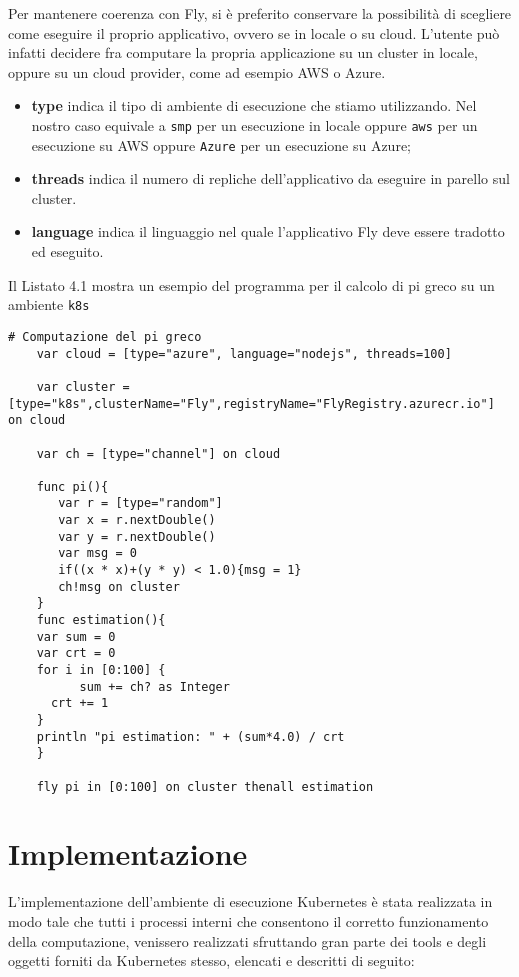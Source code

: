 Per mantenere coerenza con Fly, 
si è preferito conservare la possibilità di scegliere come eseguire il proprio applicativo, 
ovvero se in locale o su cloud. L'utente può infatti decidere fra computare la propria applicazione su un cluster in locale, 
oppure su un cloud provider, come ad esempio AWS o Azure.
\begin{itemize}
    \item\textbf{type} indica il tipo di ambiente di esecuzione che stiamo utilizzando. Nel nostro caso equivale a \verb|smp| per un esecuzione in locale oppure \verb|aws| per un esecuzione su AWS oppure \verb|Azure| per un esecuzione su Azure;
    \item\textbf{threads} indica il numero di repliche dell'applicativo da eseguire in parello sul cluster.
    \item\textbf{language} indica il linguaggio nel quale l'applicativo Fly deve essere tradotto ed eseguito.
\end{itemize}

Il Listato 4.1 mostra un esempio del programma per il calcolo di pi greco su un ambiente \verb|k8s|
\begin{lstlisting}[language=FLY,caption={Stima di PI Greco usando il metodo Monte Carlo su ambiente k8s su Azure}, label={lst:k8s}]
    # Computazione del pi greco
    var cloud = [type="azure", language="nodejs", threads=100]
    
    var cluster = [type="k8s",clusterName="Fly",registryName="FlyRegistry.azurecr.io"] on cloud 
                          
    var ch = [type="channel"] on cloud
    
    func pi(){       
       var r = [type="random"]   
       var x = r.nextDouble()          
       var y = r.nextDouble()                  
       var msg = 0  
       if((x * x)+(y * y) < 1.0){msg = 1}             
       ch!msg on cluster
    }  
    func estimation(){
    var sum = 0
    var crt = 0
    for i in [0:100] {
          sum += ch? as Integer
      crt += 1
    }
    println "pi estimation: " + (sum*4.0) / crt
    }
    
    fly pi in [0:100] on cluster thenall estimation    
\end{lstlisting}


\section{Implementazione}
L'implementazione dell'ambiente di esecuzione Kubernetes è stata realizzata in modo tale che tutti i processi interni che consentono il corretto funzionamento della computazione, 
venissero realizzati sfruttando gran parte dei tools e degli oggetti forniti da Kubernetes stesso, elencati e descritti di seguito:

